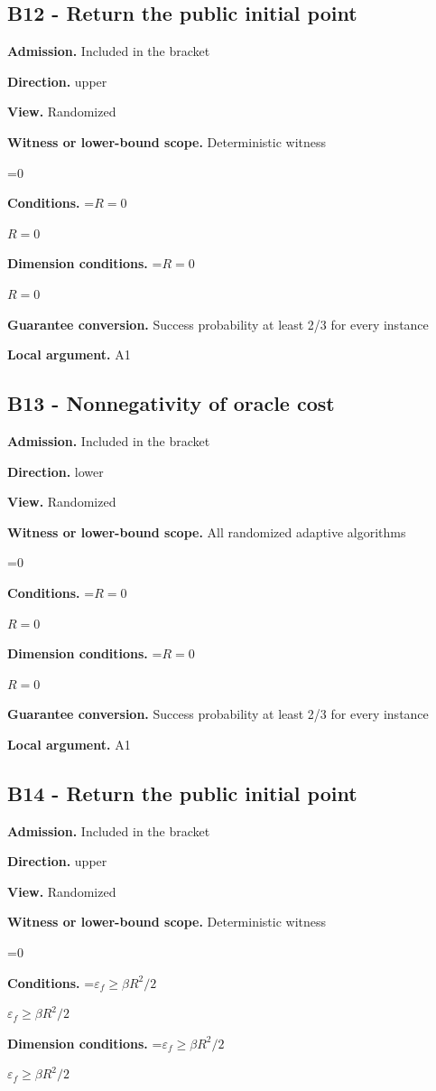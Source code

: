 \documentclass[10pt,a4paper]{article}
\newcommand{\AtlasMath}[1]{\par\begingroup\centering\setbox0=\hbox{$\displaystyle #1$}\ifdim\wd0>1.4\linewidth\typeout{ATLAS WIDE FORMULA: \the\wd0}\fi\ifdim\wd0>\linewidth\resizebox{\linewidth}{!}{\box0}\else\box0\fi\par\endgroup}
\newcommand{\AtlasInlineMath}[1]{\begingroup\setbox0=\hbox{$#1$}\ifdim\wd0>.4\linewidth\endgroup\AtlasMath{#1}\else\endgroup$#1$\fi}
\begin{document}
\subsection{B12 - Return the public initial point}
\textbf{Admission.} Included in the bracket

\textbf{Direction.} upper

\textbf{View.} Randomized

\textbf{Witness or lower-bound scope.} Deterministic witness

\AtlasMath{0}
\textbf{Conditions.} \AtlasInlineMath{R=0}

\textbf{Dimension conditions.} \AtlasInlineMath{R=0}

\textbf{Guarantee conversion.} Success probability at least 2/3 for every instance

\textbf{Local argument.} A1

\subsection{B13 - Nonnegativity of oracle cost}
\textbf{Admission.} Included in the bracket

\textbf{Direction.} lower

\textbf{View.} Randomized

\textbf{Witness or lower-bound scope.} All randomized adaptive algorithms

\AtlasMath{0}
\textbf{Conditions.} \AtlasInlineMath{R=0}

\textbf{Dimension conditions.} \AtlasInlineMath{R=0}

\textbf{Guarantee conversion.} Success probability at least 2/3 for every instance

\textbf{Local argument.} A1

\subsection{B14 - Return the public initial point}
\textbf{Admission.} Included in the bracket

\textbf{Direction.} upper

\textbf{View.} Randomized

\textbf{Witness or lower-bound scope.} Deterministic witness

\AtlasMath{0}
\textbf{Conditions.} \AtlasInlineMath{\varepsilon_f\ge\beta R^2/2}

\textbf{Dimension conditions.} \AtlasInlineMath{\varepsilon_f\ge\beta R^2/2}
\end{document}
